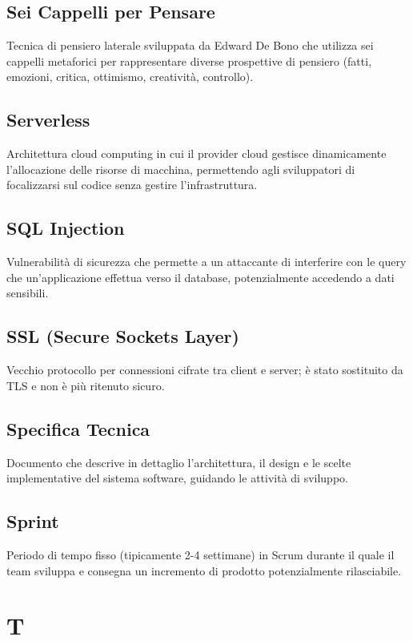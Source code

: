 \documentclass[a4paper,11pt]{article}
\begin{document}
\subsection{Sei Cappelli per Pensare}
Tecnica di pensiero laterale sviluppata da Edward De Bono che utilizza sei cappelli metaforici per rappresentare diverse prospettive di pensiero (fatti, emozioni, critica, ottimismo, creatività, controllo).

\subsection{Serverless}
Architettura cloud computing in cui il provider cloud gestisce dinamicamente l'allocazione delle risorse di macchina, permettendo agli sviluppatori di focalizzarsi sul codice senza gestire l'infrastruttura.

\subsection{SQL Injection}
Vulnerabilità di sicurezza che permette a un attaccante di interferire con le query che un'applicazione effettua verso il database, potenzialmente accedendo a dati sensibili.

\subsection{SSL (Secure Sockets Layer)}
Vecchio protocollo per connessioni cifrate tra client e server; è stato sostituito da TLS e non è più ritenuto sicuro.

\subsection{Specifica Tecnica}
Documento che descrive in dettaglio l'architettura, il design e le scelte implementative del sistema software, guidando le attività di sviluppo.

\subsection{Sprint}
Periodo di tempo fisso (tipicamente 2-4 settimane) in Scrum durante il quale il team sviluppa e consegna un incremento di prodotto potenzialmente rilasciabile.

\newpage
\section{T}
\end{document}
